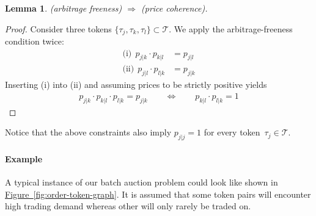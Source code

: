 \documentclass[11pt,parskip=full]{scrartcl}%
\newcommand*{\tokens}{\mathcal{T}}          %
\newcommand*{\figref}[1]{\hyperref[{#1}]{Figure~\ref*{#1}}}
\newtheorem{lemma}[theorem]{Lemma}
\begin{document}
\newpage
\begin{lemma}
  (arbitrage freeness) $ \Rightarrow $ (price coherence).
\end{lemma}
\vspace{-.8cm}
\begin{proof}
  Consider three tokens $ \{\tau_j,\tau_k,\tau_l\} \subset \tokens $.
  We apply the arbitrage-freeness condition twice:
  \begin{align*}
    \text{(i)}  \>\> p_{j|k} \cdot p_{k|l} &= p_{j|l} \\
    \text{(ii)} \>\> p_{j|l} \cdot p_{l|k} &= p_{j|k}
  \end{align*}
  Inserting (i) into (ii) and assuming prices to be strictly positive yields
  \begin{align*}
    p_{j|k} \cdot p_{k|l} \cdot p_{l|k} = p_{j|k}
    \qquad \Leftrightarrow \qquad
    p_{k|l} \cdot p_{l|k} = 1
  \end{align*}
\end{proof}
\vspace{-.4cm}

Notice that the above constraints also imply $ p_{j|j} = 1 $ for every
token~$ \tau_j \in \tokens $.

\begin{comment}
\paragraph{Properties}

Here is a list of research questions that we would like to answer.

\begin{itemize}
  \item In an optimal solution, is it guaranteed that orders can always be fully executed if their
  limit prices are strictly higher (buy order) or lower (sell order) than the exchange rate between
  the respective token pair?
  If true, we would only need to resort to partially executing orders if the execution price is
  equal to the limit price.
  \item What is the impact of optimizing the trading volume vs. the traders' welfare?
\end{itemize}
\end{comment}

\paragraph{Example}

A typical instance of our batch auction problem could look like shown in 
\figref{fig:order-token-graph}.
It is assumed that some token pairs will encounter high trading demand whereas other will only
rarely be traded on.
\end{document}

